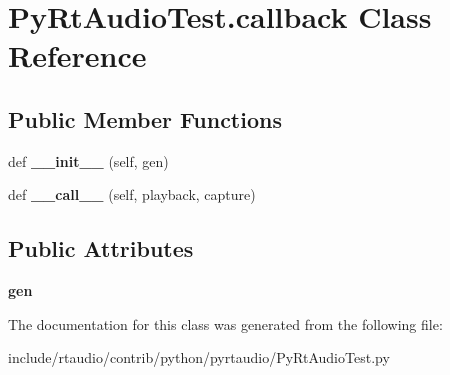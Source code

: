\hypertarget{class_py_rt_audio_test_1_1callback}{}\section{Py\+Rt\+Audio\+Test.\+callback Class Reference}
\label{class_py_rt_audio_test_1_1callback}
\subsection*{Public Member Functions}
\begin{DoxyCompactItemize}
\item 
def {\bfseries \+\_\+\+\_\+init\+\_\+\+\_\+} (self, gen)\hypertarget{class_py_rt_audio_test_1_1callback_a725736332fd9a3996281afbb985aec0f}{}\label{class_py_rt_audio_test_1_1callback_a725736332fd9a3996281afbb985aec0f}

\item 
def {\bfseries \+\_\+\+\_\+call\+\_\+\+\_\+} (self, playback, capture)\hypertarget{class_py_rt_audio_test_1_1callback_a312677afd3ddcf01019b33782d8f9b87}{}\label{class_py_rt_audio_test_1_1callback_a312677afd3ddcf01019b33782d8f9b87}

\end{DoxyCompactItemize}
\subsection*{Public Attributes}
\begin{DoxyCompactItemize}
\item 
{\bfseries gen}\hypertarget{class_py_rt_audio_test_1_1callback_aba8eaa817d956f73a27d2a9904965071}{}\label{class_py_rt_audio_test_1_1callback_aba8eaa817d956f73a27d2a9904965071}

\end{DoxyCompactItemize}


The documentation for this class was generated from the following file\+:\begin{DoxyCompactItemize}
\item 
include/rtaudio/contrib/python/pyrtaudio/Py\+Rt\+Audio\+Test.\+py\end{DoxyCompactItemize}
